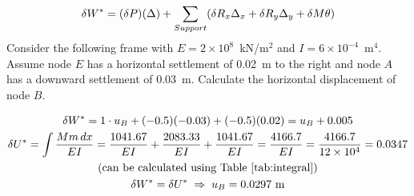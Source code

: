 \begin{example}
\begin{equation*}
  \delta W^* = (\delta P)(\Delta) + \sum_{Support}(\delta R_x\Delta_x + \delta R_y\Delta_y + \delta M\theta)
\end{equation*}
Consider the following frame with $E = 2\times10^8$~kN/m$^2$ and $I = 6\times10^{-4}$~m$^4$. Assume node $E$ has a horizontal settlement of 0.02~m to the right and node $A$ has a downward settlement of 0.03~m. Calculate the horizontal displacement of node $B$.
\begin{fig}
  
\end{fig}
\begin{fig}
  
\end{fig}
\begin{gather*}
  \delta W^* = 1\cdot u_B + (-0.5)(-0.03) + (-0.5)(0.02) = u_B + 0.005\\
  \delta U^* = \int\frac{Mm\,dx}{EI} = \frac{1041.67}{EI} + \frac{2083.33}{EI} + \frac{1041.67}{EI} = \frac{4166.7}{EI} = \frac{4166.7}{12\times10^4} = 0.0347\\
  \text{(can be calculated using Table~\ref{tab:integral})}\\
  \delta W^* = \delta U^* \;\Rightarrow\; u_B = 0.0297\text{ m}
\end{gather*}
\end{example}

\clearpage
\begin{table}[H]
  \centering
  \caption{Values of the integral $\int M_uM\,dl$ (Ghali and Neville 1997, \emph{Structural Analysis}).}
  \label{tab:integral}
  
\end{table}
